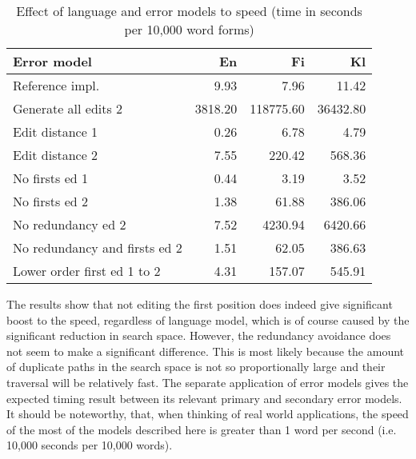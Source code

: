\documentclass[11pt]{article}
\begin{document}
\begin{table}[h]
\begin{center}
\begin{scriptsize}
\begin{tabular}{|l|rrr|}
\hline
\bf Error model & \bf En & \bf Fi & \bf Kl \\ 
\hline
Reference impl. &
9.93&7.96&11.42
\\
Generate all edits 2 & 
3818.20&118775.60&36432.80
\\
\hline
Edit distance 1 &
0.26&6.78&4.79
\\
Edit distance 2 &
7.55&220.42&568.36
\\
No firsts ed 1 & 
0.44&3.19&3.52
\\
No firsts ed 2 &
1.38&61.88&386.06
\\
No redundancy ed 2 &
7.52&4230.94&6420.66
\\
No redundancy and firsts ed 2 &
1.51&62.05&386.63
\\
Lower order first ed 1 to 2 &
4.31&157.07&545.91
\\
\hline
\end{tabular}
\end{scriptsize}
\end{center}
\caption{\label{table:error-model-vs-language-speed} Effect of language and 
error models to speed (time in seconds per 10,000 word forms)}
\end{table}

The results show that not editing the first position does indeed give
significant boost to the speed, regardless of language model, which is of course
caused by the significant reduction in search space. However, the
redundancy avoidance does not seem to make a significant difference. This is most
likely because the amount of duplicate paths in the search space is not so
proportionally large and their traversal will be relatively fast. The separate
application of error models gives the expected timing result between its
relevant primary and secondary error models. It should be noteworthy, that, when
thinking of real world applications, the speed of the most of the models
described here is greater than 1 word per second (i.e. 10,000 seconds per 10,000
words).
\end{document}
